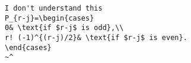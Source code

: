 \begin{verbatim}
I don't understand this
P_{r-j}=\begin{cases}
0& \text{if $r-j$ is odd},\\
r! (-1)^{(r-j)/2}& \text{if $r-j$ is even}.
\end{cases}
~^
\end{verbatim}
